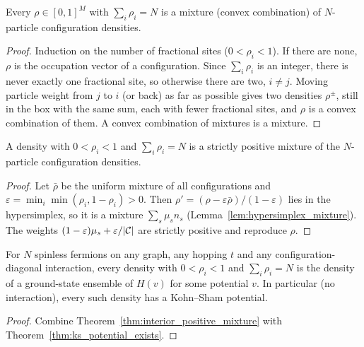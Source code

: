 \begin{lemma}
  \label{lem:hypersimplex_mixture}
  \leanok
  Every $\rho\in[0,1]^M$ with $\sum_i\rho_i=N$ is a mixture (convex combination) of $N$-particle
  configuration densities.
\end{lemma}
\begin{proof}
  \leanok
  Induction on the number of fractional sites ($0<\rho_i<1$). If there are none, $\rho$ is the occupation
  vector of a configuration. Since $\sum_i\rho_i$ is an integer, there is never exactly one fractional site,
  so otherwise there are two, $i\neq j$. Moving particle weight from $j$ to $i$ (or back) as far as possible
  gives two densities $\rho^\pm$, still in the box with the same sum, each with fewer fractional sites, and
  $\rho$ is a convex combination of them. A convex combination of mixtures is a mixture.
\end{proof}

\begin{theorem}
  \label{thm:interior_positive_mixture}
  \leanok
  A density with $0<\rho_i<1$ and $\sum_i\rho_i=N$ is a strictly positive mixture of the $N$-particle
  configuration densities.
\end{theorem}
\begin{proof}
  \leanok
  Let $\bar\rho$ be the uniform mixture of all configurations and $\varepsilon=\min_i\min(\rho_i,1-\rho_i)>0$.
  Then $\rho'=(\rho-\varepsilon\bar\rho)/(1-\varepsilon)$ lies in the hypersimplex, so it is a mixture
  $\sum_s\mu_s n_s$ (Lemma~\ref{lem:hypersimplex_mixture}). The weights $(1-\varepsilon)\mu_s+\varepsilon/|\mathcal{C}|$
  are strictly positive and reproduce $\rho$.
\end{proof}

\begin{theorem}
  \label{thm:ks_potential_exists_interior}
  \leanok
  For $N$ spinless fermions on any graph, any hopping $t$ and any configuration-diagonal
  interaction, every density with $0<\rho_i<1$ and $\sum_i\rho_i=N$ is the density of a ground-state ensemble
  of $H(v)$ for some potential $v$. In particular (no interaction), every such density has a Kohn--Sham
  potential.
\end{theorem}
\begin{proof}
  \leanok
  Combine Theorem~\ref{thm:interior_positive_mixture} with Theorem~\ref{thm:ks_potential_exists}.
\end{proof}

